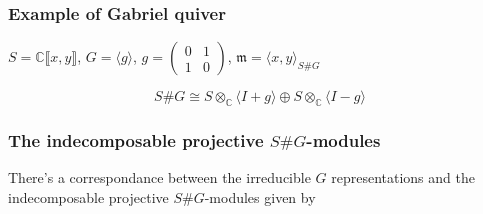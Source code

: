 \documentclass[screen, aspectratio=43]{beamer}
\theoremstyle{definition}
\newcommand{\C}{\mathbb{C}}
\begin{document}
\begin{frame}[fragile]
	\frametitle{Example of Gabriel quiver}
	\begin{example}
		\begin{center}
		$S = \C\llbracket x, y \rrbracket$, $G= \langle g \rangle$, $g = \begin{pmatrix}
		0 & 1\\
		1 & 0
		\end{pmatrix}$, $\mathfrak{m} = \langle x, y \rangle_{S\#G}$
		\end{center}
		$$ S\#G \cong S \otimes_\C \langle I + g \rangle \oplus S \otimes_\C \langle I - g \rangle $$
		\begin{center}
		\end{center}
	\end{example}
\end{frame}

\begin{frame}[fragile]
	\frametitle{The indecomposable projective $S\#G$-modules}
	\begin{theorem}
		There's a correspondance between the irreducible $G$ representations and the indecomposable projective $S\#G$-modules given by
		\begin{center}
		\end{center}
	\end{theorem}
\end{frame}
\end{document}
